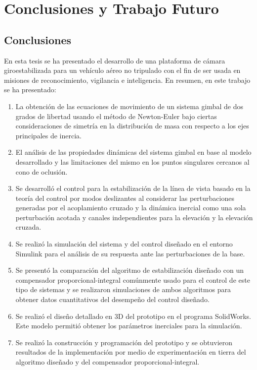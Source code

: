 \chapter{Conclusiones y Trabajo Futuro}
\section{Conclusiones}

En esta tesis se ha presentado el desarrollo de una plataforma de c\'{a}mara giroestabilizada para un veh\'{i}culo a\'{e}reo no tripulado con el fin de ser usada en misiones de reconocimiento, vigilancia e inteligencia. En resumen, en este trabajo se ha presentado:

\begin{enumerate}[1.]
\item La obtenci\'{o}n de las ecuaciones de movimiento de un sistema gimbal de dos grados de libertad usando el m\'{e}todo de Newton-Euler bajo ciertas consideraciones de simetr\'{i}a en la distribuci\'{o}n de masa con respecto a los ejes principales de inercia.

\item El an\'{a}lisis de las propiedades din\'{a}micas del sistema gimbal en base al modelo desarrollado y las limitaciones del mismo en los puntos singulares cercanos al cono de oclusi\'{o}n.      

\item Se desarroll\'{o} el control para la estabilizaci\'{o}n de la l\'{i}nea de vista basado en la teor\'{i}a del control por modos deslizantes al considerar las perturbaciones generadas por el acoplamiento cruzado y la din\'{a}mica inercial como una sola perturbaci\'{o}n acotada y canales independientes para la elevaci\'{o}n y la elevaci\'{o}n cruzada.

\item Se realiz\'{o} la simulaci\'{o}n del sistema y del control dise\~{n}ado en el entorno Simulink para el an\'{a}lisis de su respuesta ante las perturbaciones de la base.

\item Se present\'{o} la comparaci\'{o}n del algoritmo de estabilizaci\'{o}n dise\~{n}ado con un compensador proporcional-integral com\'{u}nmente usado para el control de este tipo de sistemas y se realizaron simulaciones de ambos algoritmos para obtener datos cuantitativos del desempe\~{n}o del control dise\~{n}ado.

\item Se realiz\'{o} el dise\~{n}o detallado en 3D del prototipo en el programa SolidWorks. Este modelo permiti\'{o} obtener los par\'{a}metros inerciales para la simulaci\'{o}n.

\item Se realiz\'{o} la construcci\'{o}n y programaci\'{o}n del prototipo y se obtuvieron resultados de la implementaci\'{o}n por medio de experimentaci\'{o}n en tierra del algoritmo dise\~{n}ado y del compensador proporcional-integral. 

\end{enumerate}   

